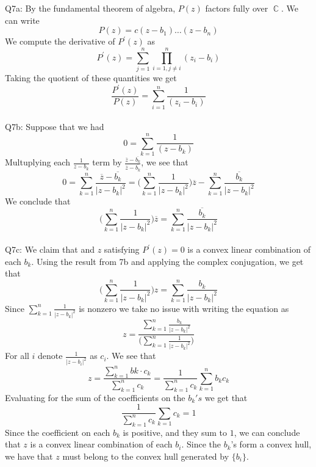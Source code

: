 \documentclass[letterpaper]{article}
\DeclareMathOperator{\C}{\mathbb{C}}
\newcommand{\ol}{\overline}
\begin{document}
\noindent
Q7a: By the fundamental theorem of algebra, $P(z)$ factors fully over $\C$. We can write $$P(z) = c (z-b_1)\dots (z-b_n)$$
We compute the derivative of $P^\prime(z)$ as 
$$P^\prime(z) = \sum_{j=1}^n \prod_{i=1, j\neq i}^n (z_i - b_i)$$
Taking the quotient of these quantities we get 
$$\frac{P^\prime(z)}{P(z)} = \sum_{i=1}^n \frac{1}{(z_i-b_i)}$$
\newline \\ 
Q7b: Suppose that we had $$0 = \sum_{k=1}^n \frac{1}{(z-b_k)}$$
Multuplying each $\frac{1}{z-b_k}$ term by $\frac{\ol{z}-\ol{b_k}}{\ol{z} - \ol{b_k}}$, we see that 
$$0 = \sum_{k=1}^n \frac{\ol{z} - \ol{b_k}}{|z-b_k|^2} = \Big( \sum_{k=1}^n \frac{1}{|z-b_k|^2} \Big)\ol{z} - \sum_{k=1}^n \frac{\ol{b_k}}{|z-b_k|^2}$$
We conclude that 
$$\Big( \sum_{k=1}^n \frac{1}{|z-b_k|^2} \Big)\ol{z} = \sum_{k=1}^n \frac{\ol{b_k}}{|z-b_k|^2}$$
\newline \\ 
Q7c: We claim that and $z$ satisfying $P^\prime(z)=0$ is a convex linear combination of each $b_k$. Using the result from 7b and applying the complex conjugation, we get that 
$$\Big( \sum_{k=1}^n \frac{1}{|z-b_k|^2}   \Big)z = \sum_{k=1}^n \frac{b_k}{|z-b_k|^2}$$
Since $\sum_{k=1}^n \frac{1}{|z-b_k|^2}$ is nonzero we take no issue with writing the equation as 
$$z = \frac{\sum_{k=1}^n \frac{b_k}{|z-b_k|^2}}{\Big( \sum_{k=1}^n \frac{1}{|z-b_k|^2} \Big)} $$
For all $i$ denote $\frac{1}{|z-b_i|^2}$ as $c_i$. 
We see that $$z = \frac{\sum_{k=1}^n bk \cdot c_k}{\sum_{k=1}^n c_k} = \frac{1}{\sum_{k=1}^n c_k} \sum_{k=1}^n b_k c_k $$
Evaluating for the sum of the coefficients on the $b_k's$ we get that $$\frac{1}{\sum_{k=1}^n c_k} \sum_{k=1}c_k =1$$ Since the coefficient on each $b_k$ is positive, and they sum to $1$, we can conclude that $z$ is a convex linear combination of each $b_i$. Since the $b_k$'s form a convex hull, we have that $z$ must belong to the convex hull generated by $\{b_i \}$. 
\end{document}
